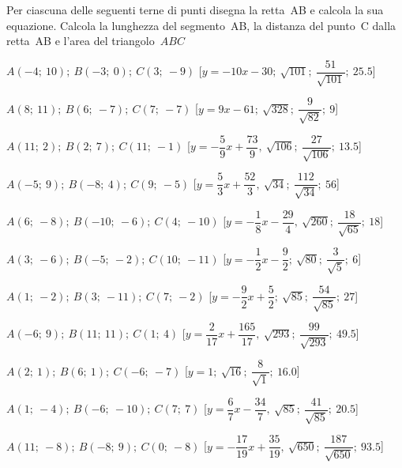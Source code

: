 \begin{esercizio}\label{ese:}
 Per ciascuna delle seguenti terne di 
punti disegna la retta~AB e calcola la sua equazione. 
Calcola la lunghezza del segmento~AB, la distanza del punto~C dalla retta~AB 
e l'area del triangolo~\(ABC\)
 \begin{enumeratea}
  \item  \(A(-4;~10);~B(-3;~0);~C(3;~-9)\) \hfill 
   [\(y=-10 x -30;~\sqrt{101};~\dfrac{51}{\sqrt{101}};~25.5\)]
  \item  \(A(8;~11);~B(6;~-7);~C(7;~-7)\) \hfill 
   [\(y=9 x -61;~\sqrt{328};~\dfrac{9}{\sqrt{82}};~9\)]
  \item  \(A(11;~2);~B(2;~7);~C(11;~-1)\) \hfill 
   [\(y=-\dfrac{5}{9} x +\dfrac{73}{9},
     ~\sqrt{106};~\dfrac{27}{\sqrt{106}};~13.5\)]
  \item  \(A(-5;~9);~B(-8;~4);~C(9;~-5)\) \hfill 
   [\(y=\dfrac{5}{3} x+\dfrac{52}{3},
     ~\sqrt{34};~\dfrac{112}{\sqrt{34}};~56\)]
  \item  \(A(6;~-8);~B(-10;~-6);~C(4;~-10)\) \hfill 
   [\(y=-\dfrac{1}{8} x-\dfrac{29}{4},
     ~\sqrt{260};~\dfrac{18}{\sqrt{65}};~18\)]
  \item  \(A(3;~-6);~B(-5;~-2);~C(10;~-11)\) \hfill 
   [\(y=-\dfrac{1}{2} x -\dfrac{9}{2};~\sqrt{80};~\dfrac{3}{\sqrt{5}};~6\)]
  \item  \(A(1;~-2);~B(3;~-11);~C(7;~-2)\) \hfill 
   [\(y=-\dfrac{9}{2} x +\dfrac{5}{2};~\sqrt{85};~\dfrac{54}{\sqrt{85}};~27\)]
  \item  \(A(-6;~9);~B(11;~11);~C(1;~4)\) \hfill 
   [\(y=\dfrac{2}{17} x+\dfrac{165}{17},
     ~\sqrt{293};~\dfrac{99}{\sqrt{293}};~49.5\)]
  \item  \(A(2;~1);~B(6;~1);~C(-6;~-7)\) \hfill 
   [\(y=1;~\sqrt{16};~\dfrac{8}{\sqrt{1}};~16.0\)]
  \item  \(A(1;~-4);~B(-6;~-10);~C(7;~7)\) \hfill 
   [\(y=\dfrac{6}{7} x-\dfrac{34}{7},
     ~\sqrt{85};~\dfrac{41}{\sqrt{85}};~20.5\)]
  \item  \(A(11;~-8);~B(-8;~9);~C(0;~-8)\) \hfill 
   [\(y=-\dfrac{17}{19} x+\dfrac{35}{19},
     ~\sqrt{650};~\dfrac{187}{\sqrt{650}};~93.5\)]

\end{enumeratea}
\end{esercizio}

